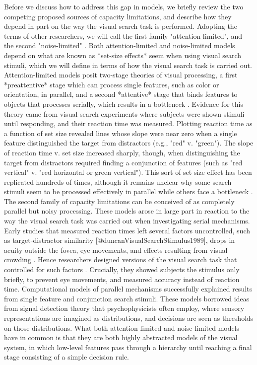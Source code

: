 \documentclass[10pt,letterpaper]{article}
\begin{document}
Before we discuss how to address this gap in models, we briefly review the two competing 
proposed sources of capacity limitations, and describe how they depend in part on the 
way the visual search task is performed. Adopting the terms of other researchers, we will 
call the first family "attention-limited", and the second "noise-limited" 
\cite{palmerSignalDetectionEvidence2011}. Both attention-limited and noise-limited models 
depend on what are known as *set-size effects* seem when using visual search stimuli, 
which we will define in terms of how the visual search task is carried out. 
Attention-limited models posit two-stage theories of visual processing, a first 
*preattentive* stage which can process single features, such as color or orientation, 
in parallel, and a second *attentive* stage that binds features to objects that processes 
serially, which results in a bottleneck 
\cite{treismanFeatureintegrationTheoryAttention1980,wolfeGuidedSearchAlternative1989,wolfeGuidedSearchRevised1994}. Evidence for this theory came from visual search 
experiments where subjects were shown stimuli until responding, and their reaction time 
was measured. Plotting reaction time as a function of set size revealed 
lines whose slope were near zero when a single feature distinguished the target from 
distractors (e.g., "red" v. "green"). The slope of reaction time v. set size increased 
sharply, though, when distinguishing the target from distractors required finding a 
conjunction of features (such as "red vertical" v. "red horizontal or green vertical"). 
This sort of set size effect has been replicated hundreds of times, although it remains 
unclear why some search stimuli seem to be processed effectively in parallel while others 
face a bottleneck \cite{wolfeWhatCanMillion1998,wolfeFiveFactorsThat2017}.
The second family of capacity limitations can be conceived of as completely parallel but 
noisy processing. These models arose in large part in reaction 
to the way the visual search task was carried out when investigating
serial mechanisms. Early studies that measured reaction times left several factors 
uncontrolled, such as target-distractor similarity [@duncanVisualSearchStimulus1989], 
drops in acuity outside the fovea, eye movements, and effects resulting from visual 
crowding \cite{bergenRapidDiscriminationVisual1983, ecksteinLowerVisualSearch1998}. 
Hence researchers designed versions of the visual search task that controlled for such 
factors \cite{palmerPsychophysicsVisualSearch2000}. Crucially, they showed subjects the 
stimulus only briefly, to prevent eye movements, and measured accuracy instead of reaction
time. Computational models of parallel mechanisms successfully explained results from 
single feature and conjunction search stimuli. These models borrowed ideas from signal 
detection theory that psychophysicists often employ, where sensory representations are
imagined as distributions, and decisions are seen as thresholds on those distributions.
What both attention-limited and noise-limited models have in common is that they are 
both highly abstracted models of the visual system, in which low-level features pass 
through a hierarchy until reaching a final stage consisting of a simple decision rule.
\end{document}
